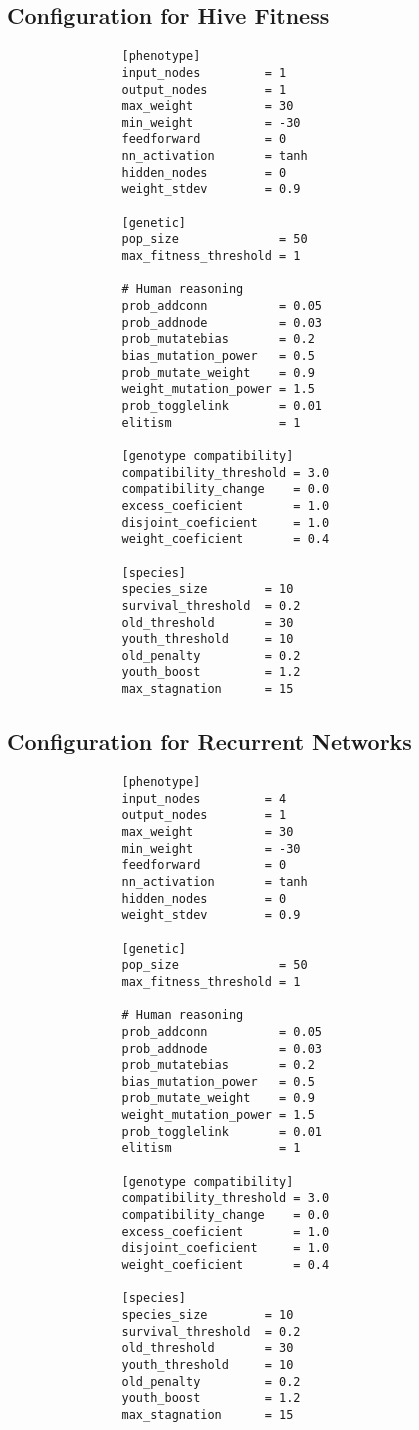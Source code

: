 \documentclass{article}
\begin{document}
		\subsection{Configuration for Hive Fitness} %
		\label{sub:configuration_for_hive_fitness}
			\begin{verbatim}
				[phenotype]
				input_nodes         = 1
				output_nodes        = 1
				max_weight          = 30
				min_weight          = -30
				feedforward         = 0
				nn_activation       = tanh 
				hidden_nodes        = 0
				weight_stdev        = 0.9

				[genetic]
				pop_size              = 50
				max_fitness_threshold = 1

				# Human reasoning
				prob_addconn          = 0.05
				prob_addnode          = 0.03
				prob_mutatebias       = 0.2
				bias_mutation_power   = 0.5
				prob_mutate_weight    = 0.9
				weight_mutation_power = 1.5
				prob_togglelink       = 0.01
				elitism               = 1

				[genotype compatibility]
				compatibility_threshold = 3.0
				compatibility_change    = 0.0
				excess_coeficient       = 1.0
				disjoint_coeficient     = 1.0
				weight_coeficient       = 0.4

				[species]
				species_size        = 10
				survival_threshold  = 0.2
				old_threshold       = 30
				youth_threshold     = 10
				old_penalty         = 0.2
				youth_boost         = 1.2
				max_stagnation      = 15
			\end{verbatim}

		\pagebreak
		\subsection{Configuration for Recurrent Networks} %
		\label{sub:configuration_for_recurrent_networks}
			\begin{verbatim}
				[phenotype]
				input_nodes         = 4
				output_nodes        = 1
				max_weight          = 30
				min_weight          = -30
				feedforward         = 0
				nn_activation       = tanh 
				hidden_nodes        = 0
				weight_stdev        = 0.9

				[genetic]
				pop_size              = 50
				max_fitness_threshold = 1

				# Human reasoning
				prob_addconn          = 0.05
				prob_addnode          = 0.03
				prob_mutatebias       = 0.2
				bias_mutation_power   = 0.5
				prob_mutate_weight    = 0.9
				weight_mutation_power = 1.5
				prob_togglelink       = 0.01
				elitism               = 1

				[genotype compatibility]
				compatibility_threshold = 3.0
				compatibility_change    = 0.0
				excess_coeficient       = 1.0
				disjoint_coeficient     = 1.0
				weight_coeficient       = 0.4

				[species]
				species_size        = 10
				survival_threshold  = 0.2
				old_threshold       = 30
				youth_threshold     = 10
				old_penalty         = 0.2
				youth_boost         = 1.2
				max_stagnation      = 15
			\end{verbatim}
\end{document}

